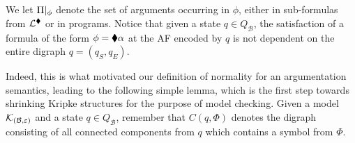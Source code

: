 \documentclass{llncs}
\newcommand{\comp}[2]{C(#1,#2)}
\newcommand{\carriers}[1]{Q_{#1}}
\newcommand{\kmod}[2]{{\cal K}_{(#1,#2)}}
\newcommand{\views}{\mathcal B}
\newcommand{\sem}{\varepsilon}
\newcommand{\depth}[1]{|{#1}|^\adia}
\begin{document}
We let ${\Pi}|_{\phi}$ denote the set of arguments occurring in $\phi$, either in sub-formulas from $\mathcal L^{\blacklozenge}$ or in programs. Notice that given a state $q \in \carriers \views$, the satisfaction of a formula of the form  $\phi = \blacklozenge \alpha$ at the AF encoded by $q$ is not dependent on the entire digraph $q = (q_S,q_E)$.

%
%
%

Indeed, this is what motivated our definition of normality for an argumentation semantics, leading to the following simple lemma, which is the first step towards shrinking Kripke structures for the purpose of model checking. Given a model $\kmod \views \sem$ and a state $q \in \carriers \views$, remember that $\comp q \Phi$ denotes the digraph consisting of all connected components from $q$ which contains a symbol from $\Phi$.
\end{document}
